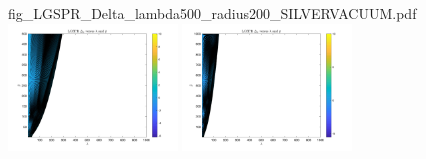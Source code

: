 \documentclass[11pt]{article}
\begin{document}
\begin{figure}[H]
{		{fig_LGSPR_Delta_lambda500_radius200_SILVERVACUUM.pdf}}
	\\
	\subfigure 
	{\includegraphics[width=0.4\textwidth]
		{fig_LGSPR_Delta_lambda1000_radius500_SILVERVACUUM.pdf}}
	\quad
	\subfigure 
	{\includegraphics[width=0.4\textwidth]
		{fig_LGSPR_Delta_lambda1000_radius1000_SILVERVACUUM.pdf}}
\end{figure}
\end{document}
